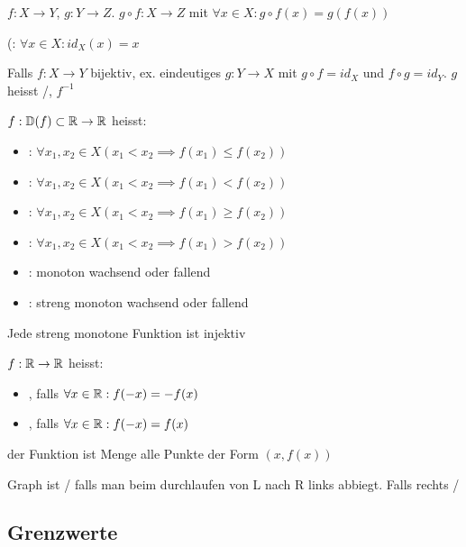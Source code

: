 \Def $f: X \to Y$, $g: Y \to Z$.  $g \circ f : X \to Z$ mit $\forall x \in X : g \circ f(x) = g(f(x))$

\Def {}(: $\forall x \in X : id_X(x) = x$

\Satz Falls $f: X \to Y$ bijektiv, ex. eindeutiges $g: Y \to X$ mit $g \circ f = id_X$ und $f \circ g = id_Y$.
$g$ heisst /, $f^{-1}$

\begin{minipage}{\linewidth}
\Def $f: \mathbb{D}(f) \subset \mathbb{R} \to \mathbb{R}$ heisst:
\begin{itemize}
    \item {}: $\forall x_1, x_2 \in X (x_1 < x_2 \implies f(x_1)\le f(x_2))$
    \item {}: $\forall x_1, x_2 \in X (x_1 < x_2 \implies f(x_1) < f(x_2))$
    \item {}: $\forall x_1, x_2 \in X (x_1 < x_2 \implies f(x_1)\ge f(x_2))$
    \item {}: $\forall x_1, x_2 \in X (x_1 < x_2 \implies f(x_1) > f(x_2))$
    \item {}: monoton wachsend oder fallend
    \item {}: streng monoton wachsend oder fallend
\end{itemize}
\end{minipage}

\Satz Jede streng monotone Funktion ist injektiv

\Def $f: \mathbb{R} \to \mathbb{R}$ heisst:
\vspace{-0.6em}
\begin{itemize}
    \item {}, falls $\forall x \in \mathbb{R} : f(-x) = -f(x)$
    \item {}, falls $\forall x \in \mathbb{R} : f(-x) = f(x)$
\end{itemize}

\Def {} der Funktion ist Menge alle Punkte der Form $(x, f(x))$

\Def Graph ist / falls man beim durchlaufen von L nach R links abbiegt.
Falls rechts /

\subsection{Grenzwerte}

